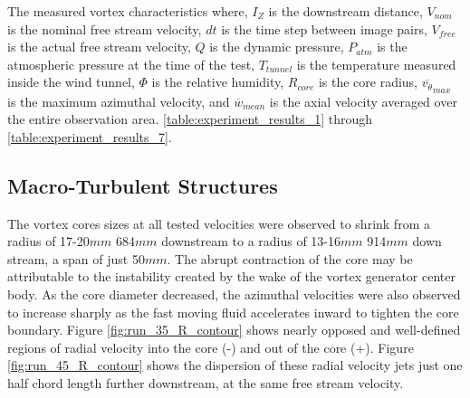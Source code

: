

The measured vortex characteristics where, $I_Z$ is the downstream distance, 
$V_{nom}$ is the nominal free stream velocity, $dt$ is the time step between 
image pairs, $V_{free}$ is the actual free stream velocity, $Q$ is the dynamic 
pressure, $P_{atm}$ is the atmospheric pressure at the time of the test, 
$T_{tunnel}$ is the temperature measured inside the wind tunnel, $\Phi$ is the 
relative humidity, $R_{core}$ is the core radius, $\overline{v_{\theta}}_{max}$ 
is the maximum azimuthal velocity, and $\overline{w}_{mean}$ is the axial 
velocity averaged over the entire observation area.
\ref{table:experiment_results_1} through \ref{table:experiment_results_7}. 









\subsection{Macro-Turbulent Structures}
\label{section:macroturb}

The vortex cores sizes at all tested velocities were observed to shrink from 
a radius of 17-20$mm$ 684$mm$ downstream to a radius of 13-16$mm$ 914$mm$ down 
stream, a span of just 50$mm$. The abrupt contraction of the core 
may be attributable to the instability created by the wake of the vortex 
generator center body. As the core diameter decreased, the azimuthal velocities 
were also observed to increase sharply as the fast moving fluid accelerates 
inward to tighten the core boundary. Figure \ref{fig:run_35_R_contour} shows 
nearly opposed and well-defined regions of radial velocity into the core (-) 
and out of the core (+). Figure \ref{fig:run_45_R_contour} shows the dispersion 
of these radial velocity jets just one half chord length further downstream, at 
the same free stream velocity. 




